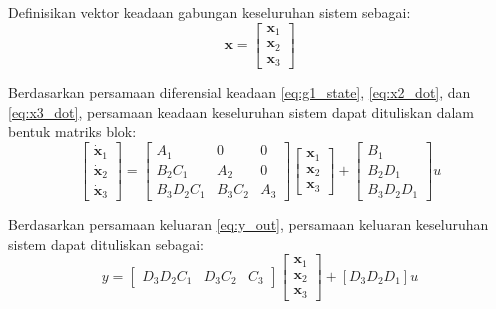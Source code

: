 \documentclass[11pt,a4paper]{article}
\begin{document}
Definisikan vektor keadaan gabungan keseluruhan sistem sebagai:
\begin{equation*}
    \mathbf{x} = \begin{bmatrix} \mathbf{x}_1 \\ \mathbf{x}_2 \\ \mathbf{x}_3 \end{bmatrix}
\end{equation*}

Berdasarkan persamaan diferensial keadaan \eqref{eq:g1_state}, \eqref{eq:x2_dot}, dan \eqref{eq:x3_dot}, persamaan keadaan keseluruhan sistem dapat dituliskan dalam bentuk matriks blok:
\begin{equation*}
    \begin{bmatrix}
        \mathbf{\dot{x}}_1 \\
        \mathbf{\dot{x}}_2 \\
        \mathbf{\dot{x}}_3
    \end{bmatrix}
    =
    \begin{bmatrix}
        A_1 & 0 & 0 \\
        B_2 C_1 & A_2 & 0 \\
        B_3 D_2 C_1 & B_3 C_2 & A_3
    \end{bmatrix}
    \begin{bmatrix}
        \mathbf{x}_1 \\
        \mathbf{x}_2 \\
        \mathbf{x}_3
    \end{bmatrix}
    +
    \begin{bmatrix}
        B_1 \\
        B_2 D_1 \\
        B_3 D_2 D_1
    \end{bmatrix}
    u
\end{equation*}

Berdasarkan persamaan keluaran \eqref{eq:y_out}, persamaan keluaran keseluruhan sistem dapat dituliskan sebagai:
\begin{equation*}
    y =
    \begin{bmatrix}
        D_3 D_2 C_1 & D_3 C_2 & C_3
    \end{bmatrix}
    \begin{bmatrix}
        \mathbf{x}_1 \\
        \mathbf{x}_2 \\
        \mathbf{x}_3
    \end{bmatrix}
    +
    \left[ D_3 D_2 D_1 \right] u
\end{equation*}
\end{document}
